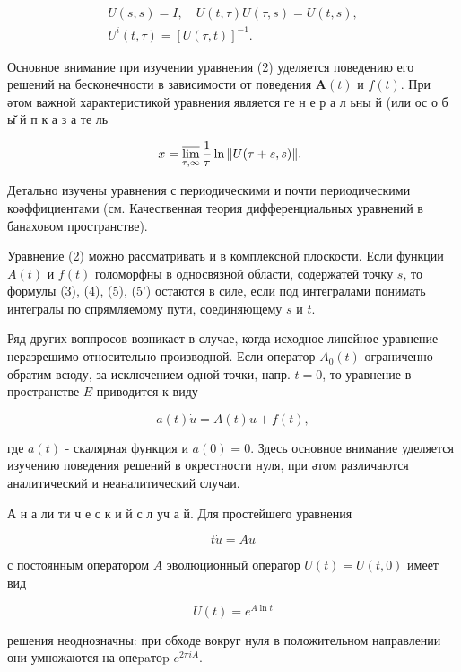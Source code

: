 \documentclass[10pt]{article}
\begin{document}
\[

\begin{gathered}

U(s, s)=I, \quad U(t, \tau) U(\tau, s)=U(t, s), \\

U^{i}(t, \tau)=[U(\tau, t)]^{-1} .

\end{gathered}

\]



Основное внимание при изучении уравнения (2) уделяется поведению его решений на бесконечности в зависимости от поведения $\boldsymbol{A}(t)$ и $f(t)$. При әтом важной характеристикой уравнения является ге н е р а л ьны й (или ос о б ы̆ й п к а з а те ль



\[

x=\varlimsup_{\tau, \infty} \frac{1}{\tau} \ln \|U(\tau+s, s)\| \text {. }

\]



Детально изучены уравнения с периодическими и почти периодическими коәффициентами (см. Качественная теория дифференциальных уравнений в банаховом пространстве).



Уравнение (2) можно рассматривать и в комплексной плоскости. Если функции $A(t)$ и $f(t)$ голоморфны в односвязной области, содержатей точку $s$, то формулы (3), (4), (5), (5') остаются в силе, если под интегралами понимать интегралы по спрямляемому пути, соединяющему $s$ и $t$.



Ряд других воппросов возникает в случае, когда исходное линейное уравнение неразрешимо относительно производной. Если оператор $A_{0}(t)$ ограниченно обратим всюду, за исключением одной точки, напр. $t=0$, то уравнение в пространстве $E$ приводится к виду



\[

a(t) \dot{u}=A(t) u+f(t),

\]



где $a(t)$ - скалярная функция и $a(0)=0$. Здесь основное внимание уделяется изучению поведения решений в окрестности нуля, при әтом различаются аналитический и неаналитический случаи.



А н а ли ти ч е с к и й с л уч а й. Для простейшего уравнения



\[

t \dot{u}=A u

\]



с постоянным оператором $A$ эволюционный оператор $U(t)=U(t, 0)$ имеет вид



\[

U(t)=e^{A \ln t}

\]



решения неоднозначны: при обходе вокруг нуля в положительном направлении они умножаются на опеpaтоp $e^{2 \pi i A}$.
\end{document}
